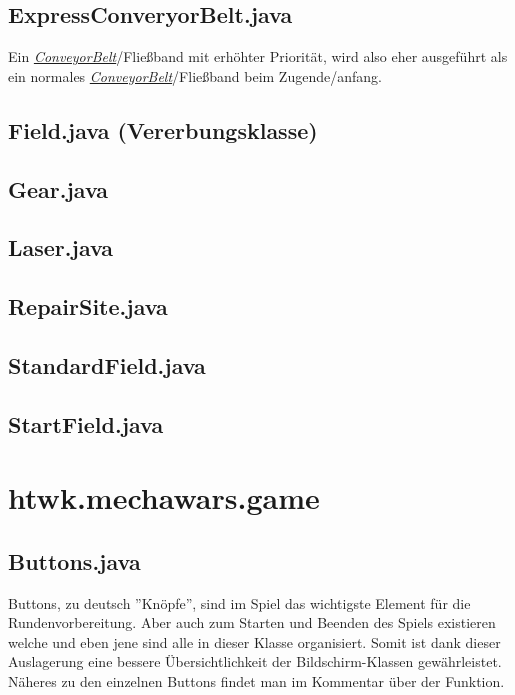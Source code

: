 \documentclass[12pt,a4paper,oneside]{book}
\theoremstyle{plain}
\numberwithin{equation}{chapter} \DeclareMathOperator{\Var}{Var}
\begin{document}
\subsection{ExpressConveryorBelt.java}
    Ein \hyperlink{ConveyorBelt.java}{\textit{ConveyorBelt}}/Fließband mit erhöhter Priorität, wird also eher ausgeführt als ein normales \hyperlink{ConveyorBelt.java}{\textit{ConveyorBelt}}/Fließband beim Zugende/anfang.
    
\hypertarget{Field.java}{}
\subsection{Field.java (Vererbungsklasse)}
    

\subsection{Gear.java}
\subsection{Laser.java}
\subsection{RepairSite.java}
\subsection{StandardField.java}
\subsection{StartField.java}

\newpage
\section{htwk.mechawars.game}
\subsection{Buttons.java}
    Buttons, zu deutsch ''Knöpfe'', sind im Spiel das wichtigste Element für die Rundenvorbereitung. Aber auch zum Starten und Beenden des Spiels existieren welche und eben jene sind alle in dieser Klasse organisiert. Somit ist dank dieser Auslagerung eine bessere Übersichtlichkeit der Bildschirm-Klassen gewährleistet. \\
    Näheres zu den einzelnen Buttons findet man im Kommentar über der Funktion.
    
\end{document}
